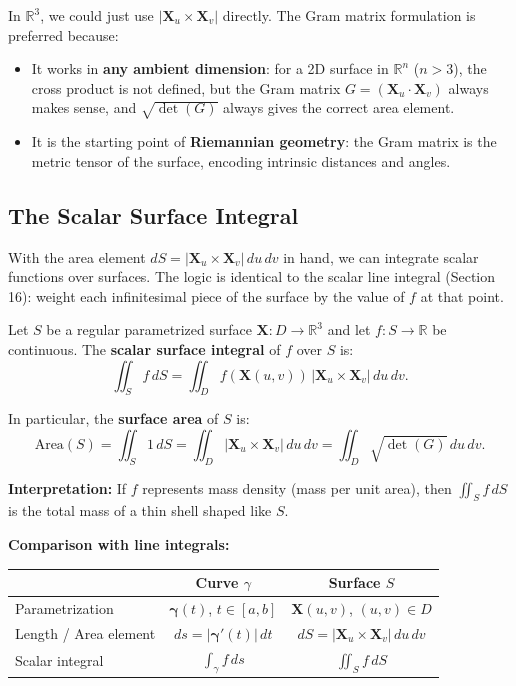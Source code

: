 \documentclass[11pt]{report}
\newcommand{\R}{\mathbb{R}}
\begin{document}
\begin{remark}
In $\R^3$, we could just use $|\mathbf{X}_u \times \mathbf{X}_v|$ directly. The Gram matrix formulation is preferred because:
\begin{itemize}
    \item It works in \textbf{any ambient dimension}: for a 2D surface in $\R^n$ ($n > 3$), the cross product is not defined, but the Gram matrix $G = (\mathbf{X}_u \cdot \mathbf{X}_v)$ always makes sense, and $\sqrt{\det(G)}$ always gives the correct area element.
    \item It is the starting point of \textbf{Riemannian geometry}: the Gram matrix is the metric tensor of the surface, encoding intrinsic distances and angles.
\end{itemize}
\end{remark}

\subsection{The Scalar Surface Integral}

With the area element $dS = |\mathbf{X}_u \times \mathbf{X}_v| \, du \, dv$ in hand, we can integrate scalar functions over surfaces. The logic is identical to the scalar line integral (Section 16): weight each infinitesimal piece of the surface by the value of $f$ at that point.

\begin{definition}
Let $S$ be a regular parametrized surface $\mathbf{X}: D \to \R^3$ and let $f: S \to \R$ be continuous. The \textbf{scalar surface integral} of $f$ over $S$ is:
\[
\iint_S f \, dS = \iint_D f(\mathbf{X}(u,v)) \, |\mathbf{X}_u \times \mathbf{X}_v| \, du \, dv.
\]

In particular, the \textbf{surface area} of $S$ is:
\[
\text{Area}(S) = \iint_S 1 \, dS = \iint_D |\mathbf{X}_u \times \mathbf{X}_v| \, du \, dv = \iint_D \sqrt{\det(G)} \, du \, dv.
\]
\end{definition}

\textbf{Interpretation:} If $f$ represents mass density (mass per unit area), then $\iint_S f \, dS$ is the total mass of a thin shell shaped like $S$.

\textbf{Comparison with line integrals:}
\begin{center}
\renewcommand{\arraystretch}{1.4}
\begin{tabular}{|l|c|c|}
\hline
& \textbf{Curve} $\gamma$ & \textbf{Surface} $S$ \\
\hline
Parametrization & $\boldsymbol{\gamma}(t)$, $t \in [a,b]$ & $\mathbf{X}(u,v)$, $(u,v) \in D$ \\
\hline
Length / Area element & $ds = |\boldsymbol{\gamma}'(t)| \, dt$ & $dS = |\mathbf{X}_u \times \mathbf{X}_v| \, du \, dv$ \\
\hline
Scalar integral & $\int_\gamma f \, ds$ & $\iint_S f \, dS$ \\
\hline
\end{tabular}
\end{center}
\end{document}

